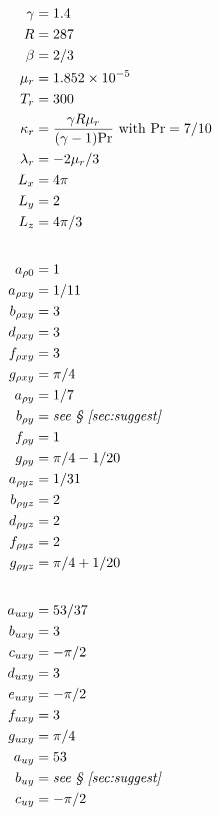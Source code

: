 \documentclass[10pt,reqno]{amsart}
\begin{document}
\begin{table}[p]
\allowdisplaybreaks
\begin{multicols}{3}
\begin{small}
\begin{align*}
\gamma &= \num{1.4} \\
R &= 287 \\
\beta &= 2 / 3 \\
\mu_r &= \num{1.852e-5} \\
T_r &= 300 \\
\kappa_r & = \frac{\gamma R \mu_r}{(\gamma - 1) \mbox{Pr}}
             \text{ with }\mbox{Pr} = 7/10 \\
\lambda_r & = - 2 \mu_r / 3 \\
L_x &= 4 \pi \\
L_y &= 2 \\
L_z &= 4 \pi / 3 \\
\intertext{}
a_{\rho{}0} &= 1 \\
a_{\rho{}xy} &= 1 / 11 \\
b_{\rho{}xy} &= 3 \\
d_{\rho{}xy} &= 3 \\
f_{\rho{}xy} &= 3 \\
g_{\rho{}xy} &= \pi / 4 \\
a_{\rho{}y} &= 1 / 7 \\
b_{\rho{}y} &= \text{\emph{see \textsection{}~\ref{sec:suggest}}} \\
f_{\rho{}y} &= 1 \\
g_{\rho{}y} &= \pi / 4 - 1 / 20 \\
a_{\rho{}yz} &= 1 / 31 \\
b_{\rho{}yz} &= 2 \\
d_{\rho{}yz} &= 2 \\
f_{\rho{}yz} &= 2 \\
g_{\rho{}yz} &= \pi / 4 + 1 / 20 \\
\intertext{}
a_{uxy} &= 53 / 37 \\
b_{uxy} &= 3 \\
c_{uxy} &= - \pi / 2 \\
d_{uxy} &= 3 \\
e_{uxy} &= - \pi / 2 \\
f_{uxy} &= 3 \\
g_{uxy} &= \pi / 4 \\
a_{uy} &= 53 \\
b_{uy} &= \text{\emph{see \textsection{}~\ref{sec:suggest}}} \\
c_{uy} &= -\pi / 2 \\

\end{align*}
\end{small}
\end{multicols}
\end{table}
\end{document}
